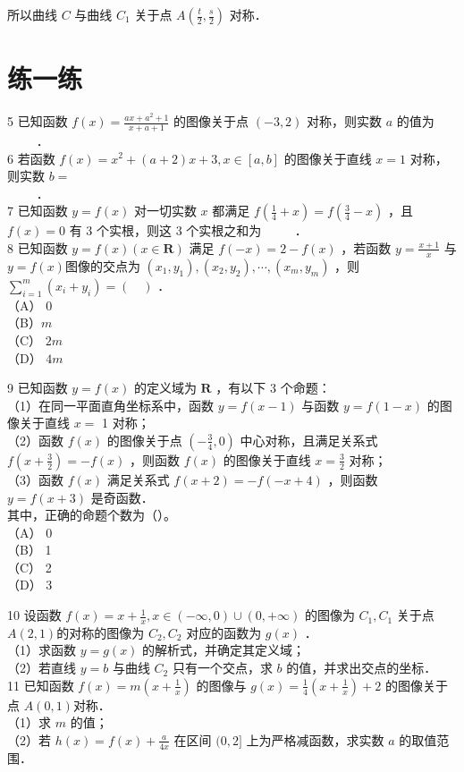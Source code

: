 \documentclass[10pt]{article}
\begin{document}
所以曲线 \(C\) 与曲线 \(C_{1}\) 关于点 \(A\left(\frac{t}{2}, \frac{s}{2}\right)\) 对称．

\section*{练一练}
5 已知函数 \(f(x)=\frac{a x+a^{2}+1}{x+a+1}\) 的图像关于点 \((-3,2)\) 对称，则实数 \(a\) 的值为\\
\(\qquad\) ．\\
6 若函数 \(f(x)=x^{2}+(a+2) x+3, x \in[a, b]\) 的图像关于直线 \(x=1\) 对称，则实数 \(b=\)\\
\(\qquad\) ．\\
7 已知函数 \(y=f(x)\) 对一切实数 \(x\) 都满足 \(f\left(\frac{1}{4}+x\right)=f\left(\frac{3}{4}-x\right)\) ，且 \(f(x)=0\) 有 3 个实根，则这 3 个实根之和为 \(\qquad\) ．\\
8 已知函数 \(y=f(x)(x \in \mathbf{R})\) 满足 \(f(-x)=2-f(x)\) ，若函数 \(y=\frac{x+1}{x}\) 与 \(y=f(x)\)图像的交点为 \(\left(x_{1}, y_{1}\right),\left(x_{2}, y_{2}\right), \cdots,\left(x_{m}, y_{m}\right)\) ，则 \(\sum_{i=1}^{m}\left(x_{i}+y_{i}\right)=(\quad)\) ．\\
（A） 0\\
（B）\(m\)\\
（C） \(2 m\)\\
（D） \(4 m\)

9 已知函数 \(y=f(x)\) 的定义域为 \(\mathbf{R}\) ，有以下 3 个命题：\\
（1）在同一平面直角坐标系中，函数 \(y=f(x-1)\) 与函数 \(y=f(1-x)\) 的图像关于直线 \(x=\) 1 对称；\\
（2）函数 \(f(x)\) 的图像关于点 \(\left(-\frac{3}{4}, 0\right)\) 中心对称，且满足关系式 \(f\left(x+\frac{3}{2}\right)=-f(x)\) ，则函数 \(f(x)\) 的图像关于直线 \(x=\frac{3}{2}\) 对称；\\
（3）函数 \(f(x)\) 满足关系式 \(f(x+2)=-f(-x+4)\) ，则函数 \(y=f(x+3)\) 是奇函数．\\
其中，正确的命题个数为（）。\\
（A） 0\\
（B） 1\\
（C） 2\\
（D） 3

10 设函数 \(f(x)=x+\frac{1}{x}, x \in(-\infty, 0) \cup(0,+\infty)\) 的图像为 \(C_{1}, C_{1}\) 关于点 \(A(2,1)\)的对称的图像为 \(C_{2}, C_{2}\) 对应的函数为 \(g(x)\) ．\\
（1）求函数 \(y=g(x)\) 的解析式，并确定其定义域；\\
（2）若直线 \(y=b\) 与曲线 \(C_{2}\) 只有一个交点，求 \(b\) 的值，并求出交点的坐标．\\
11 已知函数 \(f(x)=m\left(x+\frac{1}{x}\right)\) 的图像与 \(g(x)=\frac{1}{4}\left(x+\frac{1}{x}\right)+2\) 的图像关于点 \(A(0,1)\)对称．\\
（1）求 \(m\) 的值；\\
（2）若 \(h(x)=f(x)+\frac{a}{4 x}\) 在区间 \((0,2]\) 上为严格减函数，求实数 \(a\) 的取值范围．
\end{document}
